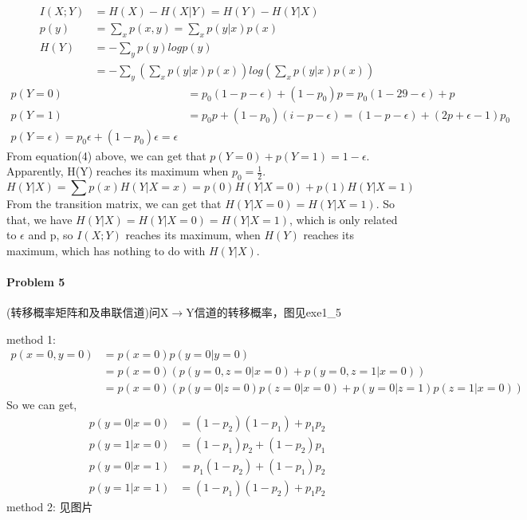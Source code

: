 \documentclass[a4paper, 12pt]{article}
\begin{document}
    \begin{equation}
        \begin{aligned}
            I(X;Y)&=H(X)-H(X|Y)=H(Y)-H(Y|X)\\
            p(y)&=\sum_x p(x,y)=\sum_x p(y|x)p(x)\\
            H(Y)&=-\sum_y p(y)logp(y)\\
            &=-\sum_y(\sum_xp(y|x)p(x))log(\sum_xp(y|x)p(x))
        \end{aligned}
    \end{equation}
    \begin{equation}
        \begin{aligned}
            p(Y=0)&=p_0(1-p-\epsilon)+(1-p_0)p=p_0(1-29-\epsilon)+p\\
            p(Y=1)&=p_0p+(1-p_0)(i-p-\epsilon)=(1-p-\epsilon)+(2p+\epsilon-1)p_0\\
            p(Y=\epsilon)=p_0\epsilon+(1-p_0)\epsilon=\epsilon
        \end{aligned}
    \end{equation}
    From equation(4) above, we can get that $p(Y=0)+p(Y=1)=1-\epsilon$. Apparently,
    H(Y) reaches its maximum when $p_0=\frac{1}{2}$.
    \[
        H(Y|X)=\sum p(x)H(Y|X=x)=p(0)H(Y|X=0)+p(1)H(Y|X=1)    
    \]
    From the transition matrix, we can get that $H(Y|X=0)=H(Y|X=1)$. So that, we 
    have $H(Y|X)=H(Y|X=0)=H(Y|X=1)$, which is only related to $\epsilon$ and p,
    so $I(X;Y)$ reaches its maximum, when $H(Y)$ reaches its maximum, which has nothing
    to do with $H(Y|X)$.

    \paragraph{Problem 5} (转移概率矩阵和及串联信道)问X$\rightarrow$Y信道的转移概率，图见exe1\_5

    method 1:
    \begin{equation}
        \begin{aligned}
            p(x=0,y=0)&=p(x=0)p(y=0|y=0)\\
            &=p(x=0)(p(y=0,z=0|x=0)+p(y=0,z=1|x=0))\\
            &=p(x=0)(p(y=0|z=0)p(z=0|x=0)+p(y=0|z=1)p(z=1|x=0))
        \end{aligned}
    \end{equation}
    So we can get,
    \begin{equation}
        \begin{aligned}
            p(y=0|x=0)&=(1-p_2)(1-p_1)+p_1p_2\\
            p(y=1|x=0)&=(1-p_1)p_2+(1-p_2)p_1\\
            p(y=0|x=1)&=p_1(1-p_2)+(1-p_1)p_2\\
            p(y=1|x=1)&=(1-p_1)(1-p_2)+p_1p_2
        \end{aligned}
    \end{equation}
    method 2: 见图片
\end{document}
